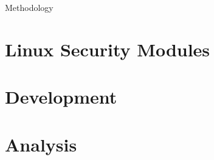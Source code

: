 Methodology

\section{Linux Security Modules}
\label{sec:lsm}

\section{Development}
\label{sec:development}

\section{Analysis}
\label{sec:analysis}